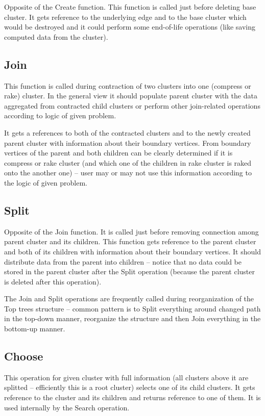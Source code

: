 Opposite of the Create function. This function is called just before deleting
base cluster. It gets reference to the underlying edge and to the base cluster
which would be destroyed and it could perform some end-of-life operations (like
saving computed data from the cluster).

\subsection{Join}

This function is called during contraction of two clusters into one (compress or
rake) cluster. In the general view it should populate parent cluster with the
data aggregated from contracted child clusters or perform other join-related
operations according to logic of given problem.

It gets a references to both of the contracted clusters and to the newly created
parent cluster with information about their boundary vertices. From boundary
vertices of the parent and both children can be clearly determined if it is
compress or rake cluster (and which one of the children in rake cluster is raked
onto the another one) -- user may or may not use this information according to
the logic of given problem.

\subsection{Split}

Opposite of the Join function. It is called just before removing connection
among parent cluster and its children. This function gets reference to the
parent cluster and both of its children with information about their boundary
vertices. It should distribute data from the parent into children -- notice that
no data could be stored in the parent cluster after the Split operation (because
the parent cluster is deleted after this operation).

The Join and Split operations are frequently called during reorganization of the
Top trees structure -- common pattern is to Split everything around changed path
in the top-down manner, reorganize the structure and then Join everything in the
bottom-up manner.

\subsection{Choose}

This operation for given cluster with full information (all clusters above it
are splitted -- efficiently this is a root cluster) selects one of its child
clusters. It gets reference to the cluster and its children and returns
reference to one of them. It is used internally by the {\I Search} operation.

